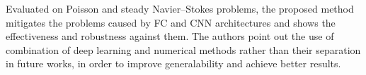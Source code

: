 Evaluated on Poisson and steady Navier--Stokes problems, the proposed method mitigates the problems caused by FC and CNN architectures and shows the effectiveness and robustness against them. The authors point out the use of combination of deep learning and numerical methods rather than their separation in future works, in order to improve generalability and achieve better results.
